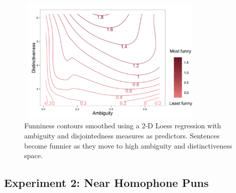 \documentclass[10pt,letterpaper]{article}
\begin{document}
\begin{figure}[t]
\includegraphics[width=90mm, height=60mm]{Plots/contour_camera_marked.png}
\caption{Funniness contours smoothed using a 2-D Loess regression with ambiguity and disjointedness measures as predictors. Sentences become funnier as they move to high ambiguity and distinctiveness space.}
\label{contour}
\end{figure}
\subsection{Experiment 2: Near Homophone Puns}
\end{document}
